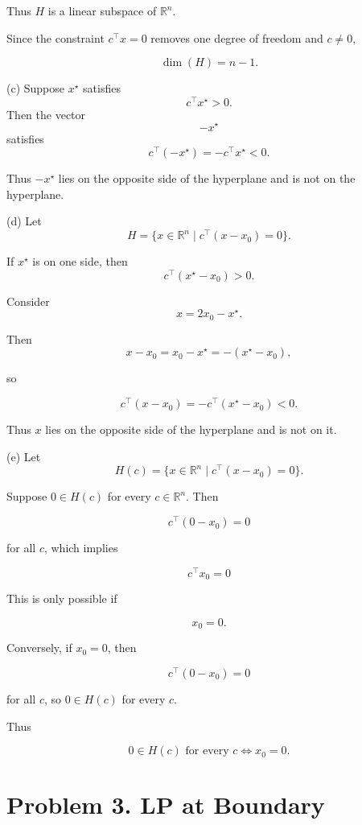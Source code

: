 \documentclass[
	12pt,
]{fphw}
\begin{document}
Thus $H$ is a linear subspace of $\mathbb{R}^n$.

Since the constraint $c^\top x = 0$ removes one degree of freedom and $c \neq 0$,

\[
\dim(H) = n-1.
\]

\bigskip

(c) Suppose $x^\star$ satisfies
\[
c^\top x^\star > 0.
\]
Then the vector
\[
-x^\star
\]
satisfies
\[
c^\top (-x^\star) = -c^\top x^\star < 0.
\]

Thus $-x^\star$ lies on the opposite side of the hyperplane and is not on the hyperplane.

\bigskip

(d) Let
\[
H = \{x \in \mathbb{R}^n \mid c^\top (x-x_0)=0\}.
\]

If $x^\star$ is on one side, then
\[
c^\top (x^\star - x_0) > 0.
\]

Consider
\[
x = 2x_0 - x^\star .
\]

Then
\[
x - x_0 = x_0 - x^\star = -(x^\star - x_0),
\]

so

\[
c^\top (x-x_0) = -c^\top (x^\star - x_0) < 0.
\]

Thus $x$ lies on the opposite side of the hyperplane and is not on it.

\bigskip

(e) Let
\[
H(c) = \{x \in \mathbb{R}^n \mid c^\top (x-x_0)=0\}.
\]

Suppose $0 \in H(c)$ for every $c \in \mathbb{R}^n$. Then

\[
c^\top (0-x_0) = 0
\]

for all $c$, which implies

\[
c^\top x_0 = 0
\]

This is only possible if

\[
x_0 = 0.
\]

Conversely, if $x_0=0$, then

\[
c^\top (0-x_0) = 0
\]

for all $c$, so $0 \in H(c)$ for every $c$.

Thus

\[
0 \in H(c) \text{ for every } c \iff x_0 = 0.
\]



\newpage
\section*{Problem 3. LP at Boundary}
\end{document}
